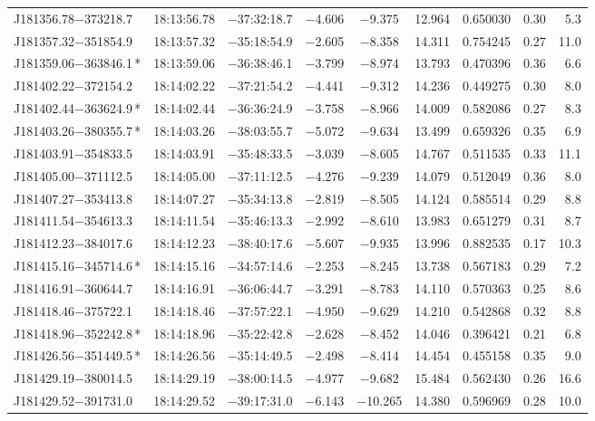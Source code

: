 \begin{table*}
\begin{tabular}{lcccccccr}
J181356.78$-$373218.7 & 18:13:56.78 & $-$37:32:18.7 & $-$4.606 & $-$9.375 & 12.964 & 0.650030 & 0.30 & 5.3 \\
J181357.32$-$351854.9 & 18:13:57.32 & $-$35:18:54.9 & $-$2.605 & $-$8.358 & 14.311 & 0.754245 & 0.27 & 11.0 \\
J181359.06$-$363846.1\,* & 18:13:59.06 & $-$36:38:46.1 & $-$3.799 & $-$8.974 & 13.793 & 0.470396 & 0.36 & 6.6 \\
J181402.22$-$372154.2 & 18:14:02.22 & $-$37:21:54.2 & $-$4.441 & $-$9.312 & 14.236 & 0.449275 & 0.30 & 8.0 \\
J181402.44$-$363624.9\,* & 18:14:02.44 & $-$36:36:24.9 & $-$3.758 & $-$8.966 & 14.009 & 0.582086 & 0.27 & 8.3 \\
J181403.26$-$380355.7\,* & 18:14:03.26 & $-$38:03:55.7 & $-$5.072 & $-$9.634 & 13.499 & 0.659326 & 0.35 & 6.9 \\
J181403.91$-$354833.5 & 18:14:03.91 & $-$35:48:33.5 & $-$3.039 & $-$8.605 & 14.767 & 0.511535 & 0.33 & 11.1 \\
J181405.00$-$371112.5 & 18:14:05.00 & $-$37:11:12.5 & $-$4.276 & $-$9.239 & 14.079 & 0.512049 & 0.36 & 8.0 \\
J181407.27$-$353413.8 & 18:14:07.27 & $-$35:34:13.8 & $-$2.819 & $-$8.505 & 14.124 & 0.585514 & 0.29 & 8.8 \\
J181411.54$-$354613.3 & 18:14:11.54 & $-$35:46:13.3 & $-$2.992 & $-$8.610 & 13.983 & 0.651279 & 0.31 & 8.7 \\
J181412.23$-$384017.6 & 18:14:12.23 & $-$38:40:17.6 & $-$5.607 & $-$9.935 & 13.996 & 0.882535 & 0.17 & 10.3 \\
J181415.16$-$345714.6\,* & 18:14:15.16 & $-$34:57:14.6 & $-$2.253 & $-$8.245 & 13.738 & 0.567183 & 0.29 & 7.2 \\
J181416.91$-$360644.7 & 18:14:16.91 & $-$36:06:44.7 & $-$3.291 & $-$8.783 & 14.110 & 0.570363 & 0.25 & 8.6 \\
J181418.46$-$375722.1 & 18:14:18.46 & $-$37:57:22.1 & $-$4.950 & $-$9.629 & 14.210 & 0.542868 & 0.32 & 8.8 \\
J181418.96$-$352242.8\,* & 18:14:18.96 & $-$35:22:42.8 & $-$2.628 & $-$8.452 & 14.046 & 0.396421 & 0.21 & 6.8 \\
J181426.56$-$351449.5\,* & 18:14:26.56 & $-$35:14:49.5 & $-$2.498 & $-$8.414 & 14.454 & 0.455158 & 0.35 & 9.0 \\
J181429.19$-$380014.5 & 18:14:29.19 & $-$38:00:14.5 & $-$4.977 & $-$9.682 & 15.484 & 0.562430 & 0.26 & 16.6 \\
J181429.52$-$391731.0 & 18:14:29.52 & $-$39:17:31.0 & $-$6.143 & $-$10.265 & 14.380 & 0.596969 & 0.28 & 10.0 \\

\end{tabular}
\end{table*}
